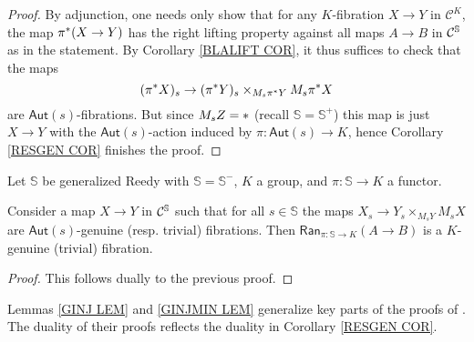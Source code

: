\documentclass[a4paper,10pt
 ,draft
]{article}%
\begin{document}
\begin{proof}
By adjunction, one needs only show that for any 
$K$-fibration $X \to Y$ in $\mathcal{C}^K$,
the map $\pi^{\**}(X \to Y)$
has the right lifting property against all maps $A \to B$ in $\mathcal{C}^{\mathbb{S}}$ as in the statement.
By Corollary \ref{BLALIFT COR}, it thus suffices to check
that the maps
\[
	(\pi^{\**} X)_s \to 
	(\pi^{\**} Y)_s \times_{M_s \pi^{\**} Y} M_s \pi^{\**} X
\]
are $\mathsf{Aut}(s)$-fibrations. But since $M_s Z = \**$ 
(recall $\mathbb{S}=\mathbb{S}^+$)
this map is just $X \to Y$ with the $\mathsf{Aut}(s)$-action induced by
$\pi \colon \mathsf{Aut}(s) \to K$, hence 
Corollary \ref{RESGEN COR} finishes the proof.
\end{proof}


\begin{lemma}\label{GINJMIN LEM}
Let $\mathbb{S}$ be generalized Reedy with $\mathbb{S}=\mathbb{S}^-$, $K$ a group, and $\pi \colon \mathbb{S} \to K$ a functor.

Consider a map $X \to Y$ in $\mathcal{C}^{\mathbb{S}}$ such that for all 
$s \in \mathbb{S}$
the maps 
$
	X_s \to Y_s \times_{M_s Y} M_s X
$	
are $\mathsf{Aut}(s)$-genuine (resp. trivial) fibrations.
Then 
$\mathsf{Ran}_{\pi\colon \mathbb{S} \to K}(A \to B)$
is a $K$-genuine (trivial) fibration.
\end{lemma}

\begin{proof}
This follows dually to the previous proof.
\end{proof}

\begin{remark}
      \label{GINJ REM}
Lemmas \ref{GINJ LEM} and \ref{GINJMIN LEM} generalize key parts of the proofs of \cite[Lemmas 5.3 and 5.5]{BM11}.  
The duality of their proofs reflects the duality in 
Corollary \ref{RESGEN COR}.
\end{remark}
\end{document}
